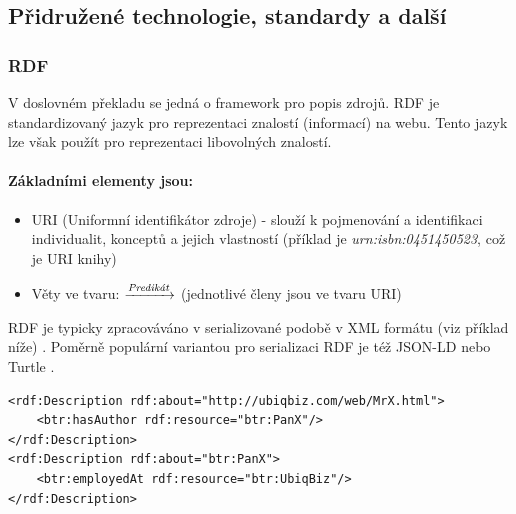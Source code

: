 \subsection{Přidružené technologie, standardy a další}
\subsubsection{RDF}
V doslovném překladu se jedná o framework pro popis zdrojů. RDF je standardizovaný jazyk pro reprezentaci znalostí (informací) na webu. Tento jazyk lze však použít pro reprezentaci libovolných znalostí.\par
\paragraph{Základními elementy jsou:}
\begin{itemize}
\item URI (Uniformní identifikátor zdroje) - slouží k pojmenování a identifikaci individualit, konceptů a jejich vlastností (příklad je \textit{urn:isbn:0451450523}, což je URI knihy)
\item Věty ve tvaru:  $\xrightarrow{\text{\textit{Predikát}}}$  (jednotlivé členy jsou ve tvaru URI)
\end{itemize}
RDF je typicky zpracováváno v serializované podobě v XML formátu (viz příklad níže) \cite{Stephan2007}. Poměrně populární variantou pro serializaci RDF je též JSON-LD \cite{JSON_LD} nebo Turtle \cite{TURTLE}.\par

\begin{lstlisting}[caption= Příklad syntaxe RDF XML, captionpos=b]
<rdf:Description rdf:about="http://ubiqbiz.com/web/MrX.html">
    <btr:hasAuthor rdf:resource="btr:PanX"/>
</rdf:Description>
<rdf:Description rdf:about="btr:PanX">
    <btr:employedAt rdf:resource="btr:UbiqBiz"/>
</rdf:Description>
\end{lstlisting} 

